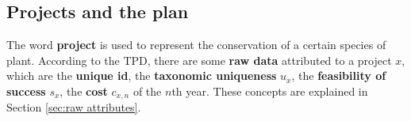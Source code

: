 \documentclass{article}
\begin{document}

\subsection{Projects and the plan}
\label{sec:projects and the plan}

The word \textbf{project} is used to represent the conservation of a certain species of plant.
According to the TPD, there are some \textbf{raw data} attributed to a project $x$, which are
the \textbf{unique id}, the \textbf{taxonomic uniqueness} $u_x$, the \textbf{feasibility of success} $s_x$, the \textbf{cost} $c_{x,n}$ of the $n$th year.
These concepts are explained in Section \ref{sec:raw attributes}.
\end{document}
